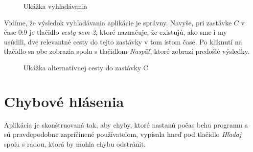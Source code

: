 \begin{figure}[H]
  \caption{Ukážka vyhľadávania}
  \label{ukazka_programu2}
\end{figure}

Vidíme, že výsledok vyhľadávania aplikácie je správny. Navyše, pri zastávke $C$ v čase 0:9 je tlačidlo \textit{cesty sem 2}, ktoré naznačuje, že existujú, ako sme i my usúdili, dve relevantné cesty do tejto zastávky v tom istom čase. Po kliknutí na tlačidlo sa obe zobrazia spolu s tlačidlom \textit{Naspäť}, ktoré zobrazí predošlé výsledky.\newline

\begin{figure}[H]
  \caption{Ukážka alternatívnej cesty do zastávky C}
  \label{ukazka_programu2_alt}
\end{figure}


\section{Chybové hlásenia}

Aplikácia je skonštruovaná tak, aby chyby, ktoré nastanú počas behu programu a sú pravdepodobne zapríčinené používateľom, vypísala hneď pod tlačidlo \textit{Hľadaj} spolu s radou, ktorá by mohla chybu odstrániť.\newline

